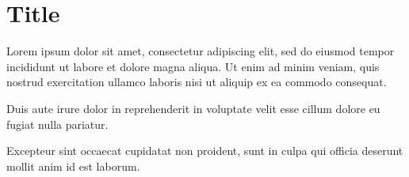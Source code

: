 \section{Title}
Lorem ipsum dolor sit amet, consectetur adipiscing elit, sed do eiusmod tempor incididunt ut labore et dolore magna 
aliqua. Ut enim ad minim veniam, quis nostrud exercitation ullamco laboris nisi ut aliquip ex ea commodo consequat.

\begin{center}
    Duis aute irure dolor in reprehenderit in voluptate velit esse cillum dolore eu fugiat nulla pariatur.
\end{center}

Excepteur sint occaecat cupidatat non proident, sunt in culpa qui officia deserunt mollit anim id est laborum.
